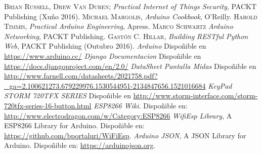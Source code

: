 \documentclass[11pt,twoside]{book}
\begin{document}
\begin{thebibliography}{99}

 \textsc{Brian Russell, Drew Van Duren}; \emph{Practical Internet of Things Security}, PACKT Publishing (Xuño 2016).
 \textsc{Michael Margolis}, \emph{Arduino Cookbook}, O'Reilly.
 \textsc{Harold Timmis}, \emph{Practical Arduino Engineering}, Apress.
 \textsc{Marco Schwartz} \emph{Arduino Networking}, PACKT Publishing.
 \textsc{Gastón C. Hillar}, \emph{Building RESTful Python Web}, PACKT Publishing (Outubro 2016).
 \textit{Arduino} Dispoñible en \url{https://www.arduino.cc/}
\textit{Django Documentacion} Dispoñible en \url{https://docs.djangoproject.com/en/2.0/}
 \textit{DataSheet Pantalla Midas} Dispoñible en \url{http://www.farnell.com/datasheets/2021758.pdf?_ga=2.100621273.679229976.1530544951-2134847656.1521016684}
 \textit{KeyPad STORM 720TFX SERIES} Dispoñible en \url{http://www.storm-interface.com/storm-720tfx-series-16-button.html}
 \textit{ESP8266 Wiki}. Dispoñible en: \url{http://www.electrodragon.com/w/Category:ESP8266}
 \textit{WifiEsp Library}, A ESP8266 Library for Arduino. Dispoñible en: \url{https://github.com/bportaluri/WiFiEsp}.
 \textit{Arduino JSON}, A JSON Library for Arduino. Dispoñible en: \url{https://arduinojson.org}.

					
\end{thebibliography}

\stopcontents[parts]

\cleardoublepage
\renewcommand{\documento}{ANEXOS}
\end{document}
